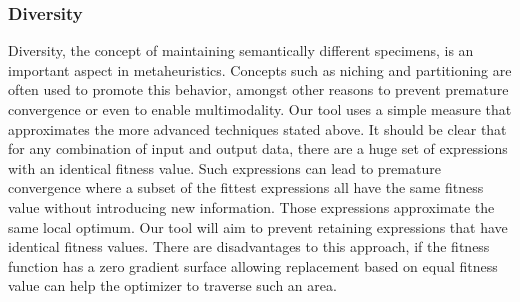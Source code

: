 \subsubsection{Diversity}\label{subsubdiversity}
Diversity, the concept of maintaining semantically different specimens, is an important aspect in metaheuristics. Concepts such as niching and partitioning are often used to promote this behavior, amongst other reasons to prevent premature convergence or even to enable multimodality.
Our tool uses a simple measure that approximates the more advanced techniques stated above. It should be clear that for any combination of input and output data, there are a huge set of expressions with an identical fitness value. Such expressions can lead to premature convergence where a subset of the fittest expressions all have the same fitness value without introducing new information. Those expressions approximate the same local optimum. Our tool will aim to prevent retaining expressions that have identical fitness values.
There are disadvantages to this approach, if the fitness function has a zero gradient surface allowing replacement based on equal fitness value can help the optimizer to traverse such an area. 

